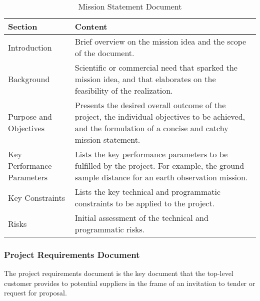 \begin{table}[h]
\caption{Mission Statement Document}
\centering
\begin{tabular}{l p{8cm}}
\toprule
\textbf{Section} & \textbf{Content} \\
\midrule
Introduction & Brief overview on the mission idea and the scope of the document. \\
Background & Scientific or commercial need that sparked the mission idea, and that elaborates on the feasibility of the realization. \\
Purpose and Objectives & Presents the desired overall outcome of the project, the individual objectives to be achieved, and the formulation of a concise and catchy mission statement. \\
Key Performance Parameters & Lists the key performance parameters to be fulfilled by the project. For example, the ground sample distance for an earth observation mission. \\
Key Constraints & Lists the key technical and programmatic constraints to be applied to the project. \\
Risks & Initial assessment of the technical and programmatic risks. \\
\bottomrule
\end{tabular}
\end{table}

\clearpage
\subsubsection{Project Requirements Document}
\label{app:Project Requirements Document}

The project requirements document is the key document that the top-level customer provides to potential suppliers in the frame of an invitation to tender or request for proposal.

